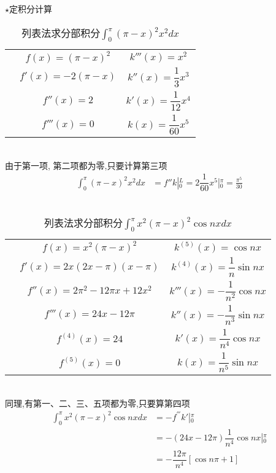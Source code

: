 $\star$定积分计算
\renewcommand\arraystretch{1.8}
\begin{table}[h]
	\caption{列表法求分部积分$ \displaystyle \int_{0}^{\pi} (\pi-x)^2 x^2  dx  $}\label{<label>}
	\centering
	\begin{tabular}
	{p{0.5cm}c|c}	
	\toprule
	& $f(x)=(\pi-x)^2$  & $k'''(x) = x^2$ \\
	& $f'(x)=-2(\pi-x)$  & $k''(x) = \dfrac{1}{3} x^3$ \\
	& $f''(x)= 2$  & $k'(x) = \dfrac{1}{12} x^4$ \\
	& $f'''(x)= 0$  & $k(x) = \dfrac{1}{60} x^5$ \\
	\bottomrule
	\end{tabular}
\end{table}
~~\\ 
由于第一项, 第二项都为零,只要计算第三项 
$$
\begin{aligned}
	\int_{0}^{\pi} (\pi-x)^2 x^2  dx &= f''k \left\vert _{0 }^{L} \right. = 2 \dfrac{1}{60} x^5 \left\vert_{0}^{\pi} \right.= \frac{\pi^5}{30}
\end{aligned}  
$$  
~~\\ 
\renewcommand\arraystretch{1.8}
\begin{table}[h]
	\caption{列表法求分部积分$ \displaystyle \int_{0}^{\pi}   x^2 (\pi-x)^2   \cos nx dx  $}\label{<label>}
	\centering
	\begin{tabular}
	{p{0.5cm}c|c}	
	\toprule
	& $f(x)=x^2 (\pi-x)^2$  & $k^{(5)}(x) = \cos nx $ \\
	& $f'(x)=2x(2x - \pi )(x - \pi )$  & $k^{(4)}(x) = \dfrac{1}{n} \sin nx $ \\
	& $f''(x)= 2\pi ^2 -12\pi x+12x^2$  & $k'''(x)= -\dfrac{1}{n^2} \cos nx $ \\
	& $f'''(x)= 24x -12\pi$  & $k''(x) = -\dfrac{1}{n^3} \sin nx $ \\
	& $f^{(4)}(x)= 24$  & $k'(x) = \dfrac{1}{n^4} \cos nx $ \\
	& $f^{(5)}(x)= 0$  & $k(x) = \dfrac{1}{n^5} \sin nx $ \\
	\bottomrule
	\end{tabular}
\end{table}
~~\\ 
同理,有第一、二、三、五项都为零,只要算第四项
$$
\begin{aligned}
	\int_{0}^{\pi}   x^2 (\pi-x)^2   \cos nx dx &= - f^{'''}k' \left\vert_{0}^{\pi} \right. \\
	&= - (24x -12\pi) \dfrac{1}{n^4} \cos nx \left\vert_{0}^{\pi} \right.\\
	&= -\dfrac{12 \pi}{n^4}  [\cos n\pi +1 ]
\end{aligned}  
$$ 
